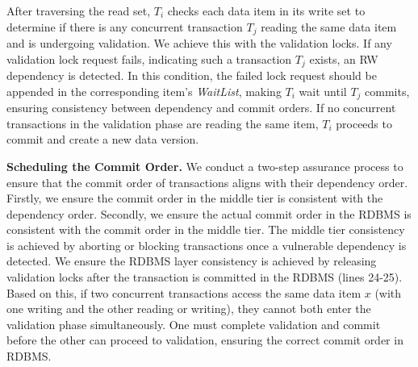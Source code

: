 After traversing the read set, $T_i$ checks each data item in its write set to determine if there is any concurrent transaction $T_j$ reading the same data item and is undergoing validation. 
We achieve this with the validation locks. 
If any validation lock request fails, indicating such a transaction $T_j$ exists, an RW dependency is detected. In this condition, the failed lock request should be appended in the corresponding item's \textit{WaitList}, making $T_i$ wait until $T_j$ commits, ensuring consistency between dependency and commit orders. If no concurrent transactions in the validation phase are reading the same item, $T_i$ proceeds to commit and create a new data version. 

\noindent\textbf{Scheduling the Commit Order.} We conduct a two-step assurance process to ensure that the commit order of transactions aligns with their dependency order. Firstly, we ensure the commit order in the middle tier is consistent with the dependency order.  Secondly, we ensure the actual commit order in the RDBMS is consistent with the commit order in the middle tier. The middle tier consistency is achieved by aborting or blocking transactions once a vulnerable dependency is detected. We ensure the RDBMS layer consistency is achieved by releasing validation locks after the transaction is committed in the RDBMS (lines 24-25). Based on this, if two concurrent transactions access the same data item $x$ (with one writing and the other reading or writing), they cannot both enter the validation phase simultaneously. One must complete validation and commit before the other can proceed to validation, ensuring the correct commit order in RDBMS. 




